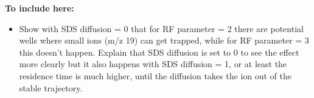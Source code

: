 \textbf{To include here:}
\begin{itemize}
\item Show with SDS diffusion = 0 that for RF parameter = 2 there are potential wells where small ions (m/z 19) can get trapped, while for RF parameter = 3 this doesn't happen. Explain that SDS diffusion is set to 0 to see the effect more clearly but it also happens with SDS diffusion = 1, or at least the residence time is much higher, until the diffusion takes the ion out of the stable trajectory.
\end{itemize}




\begin{figure}%
\begin{center}
\\ \bigskip
{}
\\ \bigskip

\end{center}
\end{figure}
